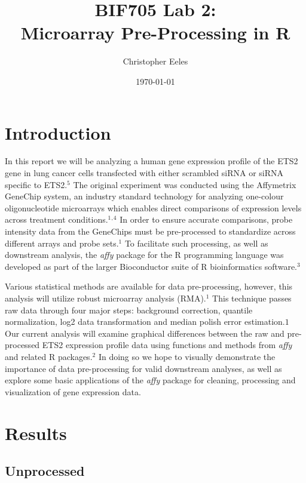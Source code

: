 \documentclass[11 pt,letterpaper]{article}
\title{\LARGE \bf
    BIF705 Lab 2:\\
    Microarray Pre-Processing in R
    }
\author{Christopher Eeles}
\date{\small \today}
\begin{document}
\maketitle

\section{Introduction}
    In this report we will be analyzing a human gene expression profile of the ETS2 gene in lung cancer cells transfected with either scrambled siRNA or siRNA specific to ETS2.$^5$
    The original experiment was conducted using the Affymetrix GeneChip system, an industry standard technology for analyzing one-colour oligonucleotide microarrays which enables direct comparisons of expression levels across treatment conditions.$^1$$^,$$^4$
    In order to ensure accurate comparisons, probe intensity data from the GeneChips must be pre-processed to standardize across different arrays and probe sets.$^1$
    To facilitate such processing, as well as downstream analysis, the \textit{affy} package for the R programming language was developed as part of the larger Bioconductor suite of R bioinformatics software.$^3$
    
    Various statistical methods are available for data pre-processing, however, this analysis will utilize robust microarray analysis (RMA).$^1$
    This technique passes raw data through four major steps: background correction, quantile normalization, log2 data transformation and median polish error estimation.$1$
    Our current analysis will examine graphical differences between the raw and pre-processed ETS2 expression profile data using functions and methods from \textit{affy} and related R packages.$^2$
    In doing so we hope to visually demonstrate the importance of data pre-processing for valid downstream analyses, as well as explore some basic applications of the \textit{affy} package for cleaning, processing and visualization of gene expression data.

\section{Results}
    \subsection{Unprocessed}
\end{document}
